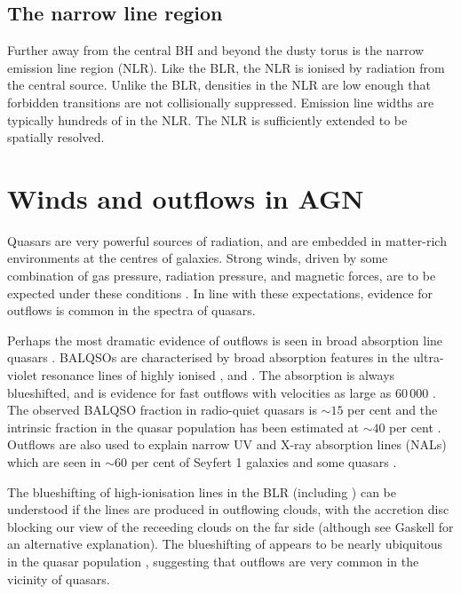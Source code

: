 \subsection{The narrow line region}

Further away from the central BH and beyond the dusty torus is the narrow emission line region (NLR). 
Like the BLR, the NLR is ionised by radiation from the central source. 
Unlike the BLR, densities in the NLR are low enough that forbidden transitions are not collisionally suppressed. 
Emission line widths are typically hundreds of \kms in the NLR. 
The NLR is sufficiently extended to be spatially resolved. 

\section{Winds and outflows in AGN}

Quasars are very powerful sources of radiation, and are embedded in matter-rich environments at the centres of galaxies.
Strong winds, driven by some combination of gas pressure, radiation pressure, and magnetic forces, are to be expected under these conditions \citep[e.g.][]{blandford82b,proga00,everett05}. 
In line with these expectations, evidence for outflows is common in the spectra of quasars. 

Perhaps the most dramatic evidence of outflows is seen in broad absorption line quasars \citep[BALQSOs;][]{weymann91}.
BALQSOs are characterised by broad absorption features in the ultra-violet resonance lines of highly ionised ,  and . 
The absorption is always blueshifted, and is evidence for fast outflows with velocities as large as 60\,000 \kms \citep[e.g.][]{turnshek88}. 
The observed  BALQSO fraction in radio-quiet quasars is $\sim$$15$ per cent \citep[e.g.][]{hewett03,reichard03} and the intrinsic fraction in the quasar population has been estimated at $\sim$$40$ per cent \citep{allen11}.
Outflows are also used to explain narrow UV and X-ray absorption lines (NALs) which are seen in $\sim$$60$ per cent of Seyfert 1 galaxies \citep{crenshaw99} and some quasars \citep[e.g.][]{hamann97}. 

The blueshifting of high-ionisation lines in the BLR (including ) can be understood if the lines are produced in outflowing clouds, with the accretion disc blocking our view of the receeding clouds on the far side (although see Gaskell for an alternative explanation). 
The blueshifting of  appears to be nearly ubiquitous in the quasar population \citep[e.g.][]{richards02,richards11}, suggesting that outflows are very common in the vicinity of quasars. 

